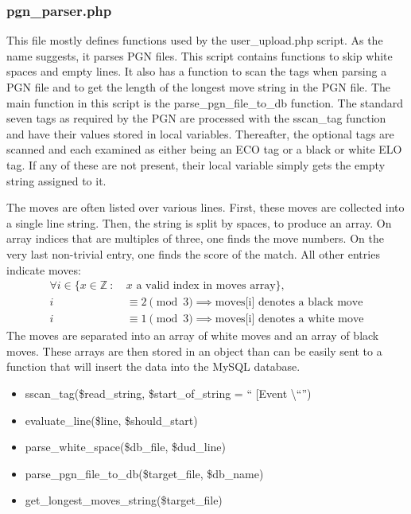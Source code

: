 \documentclass{article}
\begin{document}
\subsubsection{pgn\_parser.php}
This file mostly defines functions used by the user\_upload.php script.
As the name suggests, it parses PGN files. This script contains functions to
skip white spaces and empty lines. It also has a function to scan the tags
when parsing a PGN file and to get the length of the longest move string in
the PGN file. The main function in this script is the parse\_pgn\_file\_to\_db
function. The standard seven tags as required by the PGN are processed with
the sscan\_tag function and have their values stored in local variables.
Thereafter, the optional tags are scanned and each examined as either being
an ECO tag or a black or white ELO tag.  If any of these are not present,
their local variable simply gets the empty string assigned to it.

The moves are often listed over various lines.  First, these moves are
collected into a single line string.  Then, the string is split by spaces,
to produce an array.  On array indices that are multiples of three, one
finds the move numbers.  On the very last non-trivial entry, one finds
the score of the match.  All other entries indicate moves:
\begin{align*}
\forall i \in \{ x\in \mathbb{Z}\ :\ & x\text{ a valid index in moves array}\},\\
i & \equiv 2\pmod 3 \implies \text{moves[i] denotes a black move}\\
i & \equiv 1\pmod 3 \implies \text{moves[i] denotes a white move}
\end{align*}
The moves are separated into an array of white moves and an array of black
moves. These arrays are then stored in an object than can be easily sent to
a function that will insert the data into the MySQL database.

\begin{itemize}
	\item sscan\_tag(\$read\_string, \$start\_of\_string = \textquotedblleft
	[Event \textbackslash \textquotedblleft\textquotedblright )
	\item evaluate\_line(\$line, \$should\_start)
	\item parse\_white\_space(\$db\_file, \$dud\_line)
	\item parse\_pgn\_file\_to\_db(\$target\_file, \$db\_name)
	\item get\_longest\_moves\_string(\$target\_file)
\end{itemize}
\end{document}
